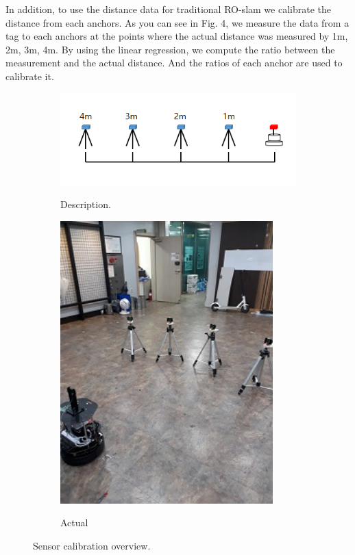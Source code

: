 \documentclass[letterpaper, 10 pt, conference]{ieeeconf}  %
\begin{document}
 In addition, to use the distance data for traditional RO-slam we calibrate the distance from each anchors. As you can see in Fig. 4, we measure the data from a tag to each anchors at the points where the actual distance was measured by 1m, 2m, 3m, 4m. By using the linear regression, we compute the ratio between the measurement and the actual distance. And the ratios of each anchor are used to calibrate it.
  \begin{figure}[h]
 	\centering
 	\begin{subfigure}[b]{.35\textwidth}
 		\centering
 		\includegraphics[width=.9\textwidth]{calib}
 		\label{fig:sub1} 	
 		\caption{Description.}
 	\end{subfigure}%
 	\begin{subfigure}[b]{.15\textwidth}
 		\centering
 		\includegraphics[width=0.9\textwidth]{calib2}
 		\label{fig:sub2} 	
 		\caption{Actual}
 	\end{subfigure}
 	\caption{Sensor calibration overview.}
 	\label{fig:test}
 \end{figure}
\end{document}

